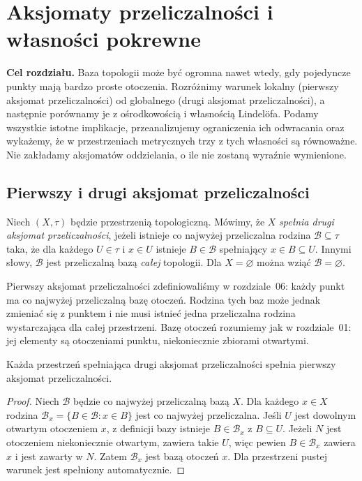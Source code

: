 \chapter{Aksjomaty przeliczalności i własności pokrewne}
\label{ch:topog-przeliczalnosc}

\noindent\textbf{Cel rozdziału.}
Baza topologii może być ogromna nawet wtedy, gdy pojedyncze punkty
mają bardzo proste otoczenia. Rozróżnimy warunek lokalny
(pierwszy aksjomat przeliczalności) od globalnego
(drugi aksjomat przeliczalności),
a następnie porównamy je z ośrodkowością i własnością Lindelöfa.
Podamy wszystkie istotne implikacje, przeanalizujemy ograniczenia
ich odwracania oraz wykażemy, że w przestrzeniach metrycznych
trzy z tych własności są równoważne. Nie zakładamy aksjomatów
oddzielania, o ile nie zostaną wyraźnie wymienione.

\section{Pierwszy i drugi aksjomat przeliczalności}
\label{sec:topog-dwie-przeliczalnosci}

\begin{definicja}
\label{def:topog-druga-przeliczalnosc}
Niech $(X,\tau)$ będzie przestrzenią topologiczną.
Mówimy, że $X$ \emph{spełnia drugi aksjomat przeliczalności},
jeżeli istnieje co najwyżej przeliczalna rodzina $\mathcal B\subseteq\tau$
taka, że dla każdego $U\in\tau$ i $x\in U$ istnieje
$B\in\mathcal B$ spełniający $x\in B\subseteq U$.
Innymi słowy, $\mathcal B$ jest przeliczalną bazą \emph{całej}
topologii. Dla $X=\varnothing$ można wziąć $\mathcal B=\varnothing$.
\end{definicja}

\begin{uwaga}
\label{rem:topog-lokalnie-globalnie-przeliczalnosc}
Pierwszy aksjomat przeliczalności zdefiniowaliśmy w rozdziale~06:
każdy punkt ma co najwyżej przeliczalną bazę otoczeń.
Rodzina tych baz może jednak zmieniać się z punktem i nie musi
istnieć jedna przeliczalna rodzina wystarczająca dla całej przestrzeni.
Bazę otoczeń rozumiemy jak w rozdziale~01: jej elementy są
otoczeniami punktu, niekoniecznie zbiorami otwartymi.
\end{uwaga}

\begin{twierdzenie}
\label{thm:topog-druga-pierwsza}
Każda przestrzeń spełniająca drugi aksjomat przeliczalności
spełnia pierwszy aksjomat przeliczalności.
\end{twierdzenie}
\begin{proof}
Niech $\mathcal B$ będzie co najwyżej przeliczalną bazą $X$.
Dla każdego $x\in X$ rodzina
$\mathcal B_x=\{B\in\mathcal B:x\in B\}$
jest co najwyżej przeliczalna. Jeśli $U$ jest dowolnym
otwartym otoczeniem $x$, z definicji bazy istnieje
$B\in\mathcal B_x$ z $B\subseteq U$. Jeżeli $N$ jest
otoczeniem niekoniecznie otwartym, zawiera takie $U$,
więc pewien $B\in\mathcal B_x$ zawiera $x$ i jest zawarty w $N$.
Zatem $\mathcal B_x$ jest bazą otoczeń $x$.
Dla przestrzeni pustej warunek jest spełniony automatycznie.
\end{proof}

